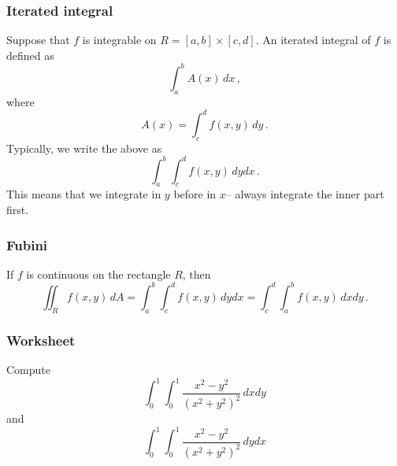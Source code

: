 \documentclass[aspectratio=169]{beamer}
\begin{document}
\begin{frame}
    \frametitle{Iterated integral}
    Suppose that \(f\) is integrable on \(R= [a,b]\times [c,d]\).
    An iterated integral of \(f\) is defined as
    \begin{equation*}
        \int_a^b A(x) \, dx \,,
    \end{equation*}
    where
    \begin{equation*}
        A(x) = \int_c^d f(x,y) \, dy \,.
    \end{equation*}
    Typically, we write the above as
    \begin{equation*}
       \int_a^b \int_c^d f(x,y) \, dy dx \,. 
    \end{equation*}
    This means that we integrate in \(y\) before in \(x\)-- always integrate the inner part first.
\end{frame}

\begin{frame}
    \frametitle{Fubini}
    \begin{theorem}
        If \(f\) is continuous on the rectangle \(R\), then
        \begin{equation*}
            \iint_R f(x,y) \, dA = \int_a^b \int_c^d f(x,y) \, dy dx = \int_c^d \int_a^b f(x,y) \, dx dy \,.
        \end{equation*}

    \end{theorem}
\end{frame}

\begin{frame}
    \frametitle{Worksheet}
            Compute
            $$\int_0^1 \int_0^1 \frac{x^2 - y^2}{(x^2 + y^2)^2} \, dx dy$$
            and 
            $$\int_0^1 \int_0^1 \frac{x^2 - y^2}{(x^2 + y^2)^2} \, dy dx$$
        \end{frame}
\end{document}
